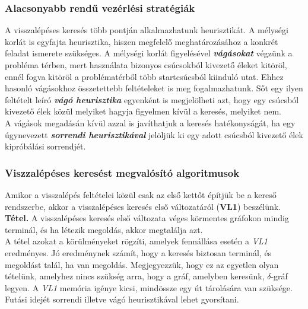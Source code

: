 \documentclass[12pt,margin=0px]{article}
\begin{document}
    \subsubsection*{Alacsonyabb rendű vezérlési stratégiák}

    \noindent A visszalépéses keresés több pontján alkalmazhatunk heurisztikát. A mélységi korlát is egyfajta heurisztika, hiszen megfelelő meghatározásához a konkrét feladat ismerete szükséges. A mélységi korlát figyelésével \emph{\textbf{vágásokat}} végzünk a probléma térben, mert használata bizonyos csúcsokból kivezető éleket kitöröl, ennél fogva kitöröl a problématérből több startcsúcsból kiinduló utat. Ehhez hasonló vágásokhoz összetettebb feltételeket is meg fogalmazhatunk. Sőt egy ilyen feltételt leíró \emph{\textbf{vágó heurisztika}} egyenként is megjelölheti azt, hogy egy csúcsból kivezető élek közül melyiket hagyja figyelmen kívül a keresés, melyiket nem.\\

    \noindent A vágások megadásán kívül azzal is javíthatjuk a keresés hatékonyságát, ha egy úgynevezett \emph{\textbf{sorrendi heurisztikával}} jelöljük ki egy adott csúcsból kivezető élek kipróbálási sorrendjét.

    \subsubsection*{Viszzalépéses keresést megvalósító algoritmusok}

    \noindent Amikor a visszalépés feltételei közül csak az első kettőt építjük be a kereső rendszerbe, akkor a visszalépéses keresés első változatáról (\textbf{VL1}) beszélünk.\\

    \noindent \textbf{Tétel.} A visszalépéses keresés első változata véges körmentes gráfokon mindig terminál, és ha létezik megoldás, akkor megtalálja azt.\\

    \noindent A tétel azokat a körülményeket rögzíti, amelyek fennállása esetén a \emph{VL1} eredményes. Jó eredménynek számít, hogy a keresés biztosan terminál, és megoldást talál, ha van megoldás. Megjegyezzük, hogy ez az egyetlen olyan tételünk, amelyhez nincs szükség arra, hogy a gráf, amelyben keresünk, $\delta$-gráf legyen. A \emph{VL1} memória igénye kicsi, mindössze egy út tárolására van szüksége. Futási idejét sorrendi illetve vágó heurisztikával lehet gyorsítani.\\
\end{document}

